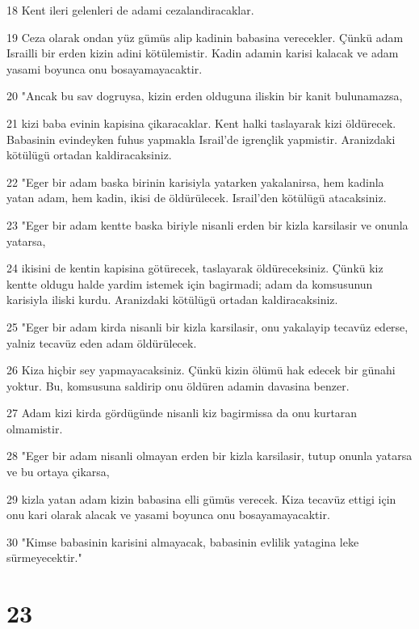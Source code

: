 \par 18 Kent ileri gelenleri de adami cezalandiracaklar.
\par 19 Ceza olarak ondan yüz gümüs alip kadinin babasina verecekler. Çünkü adam Israilli bir erden kizin adini kötülemistir. Kadin adamin karisi kalacak ve adam yasami boyunca onu bosayamayacaktir.
\par 20 "Ancak bu sav dogruysa, kizin erden olduguna iliskin bir kanit bulunamazsa,
\par 21 kizi baba evinin kapisina çikaracaklar. Kent halki taslayarak kizi öldürecek. Babasinin evindeyken fuhus yapmakla Israil'de igrençlik yapmistir. Aranizdaki kötülügü ortadan kaldiracaksiniz.
\par 22 "Eger bir adam baska birinin karisiyla yatarken yakalanirsa, hem kadinla yatan adam, hem kadin, ikisi de öldürülecek. Israil'den kötülügü atacaksiniz.
\par 23 "Eger bir adam kentte baska biriyle nisanli erden bir kizla karsilasir ve onunla yatarsa,
\par 24 ikisini de kentin kapisina götürecek, taslayarak öldüreceksiniz. Çünkü kiz kentte oldugu halde yardim istemek için bagirmadi; adam da komsusunun karisiyla iliski kurdu. Aranizdaki kötülügü ortadan kaldiracaksiniz.
\par 25 "Eger bir adam kirda nisanli bir kizla karsilasir, onu yakalayip tecavüz ederse, yalniz tecavüz eden adam öldürülecek.
\par 26 Kiza hiçbir sey yapmayacaksiniz. Çünkü kizin ölümü hak edecek bir günahi yoktur. Bu, komsusuna saldirip onu öldüren adamin davasina benzer.
\par 27 Adam kizi kirda gördügünde nisanli kiz bagirmissa da onu kurtaran olmamistir.
\par 28 "Eger bir adam nisanli olmayan erden bir kizla karsilasir, tutup onunla yatarsa ve bu ortaya çikarsa,
\par 29 kizla yatan adam kizin babasina elli gümüs verecek. Kiza tecavüz ettigi için onu kari olarak alacak ve yasami boyunca onu bosayamayacaktir.
\par 30 "Kimse babasinin karisini almayacak, babasinin evlilik yatagina leke sürmeyecektir."

\chapter{23}

